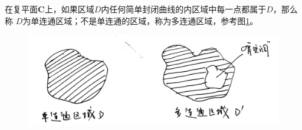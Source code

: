 \documentclass[lang=cn,10pt]{elegantbook}
\begin{document}
\begin{definition}[连通区域]
	在复平面$\mathbf{C}$上，如果区域$D$内任何简单封闭曲线的内区域中每一点都属于$D$，那么称
	$D$为单连通区域；不是单连通的区域，称为多连通区域，参考图\ref{imA_2}。
\end{definition}

\begin{figure}[h]
	\centering
	\includegraphics[scale=0.1]{image/A_2.jpg}
	\caption{}
	\label{imA_2}
\end{figure}
\end{document}
